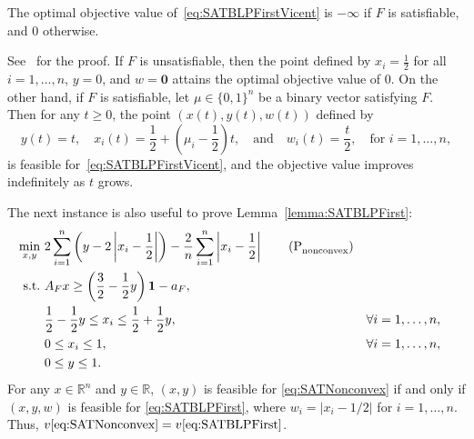 \documentclass[runningheads,orivec]{llncs}
\newcommand{\MacroColor}[1]{#1}
\newcommand{\ZeroVector}{\mathbf{0}}
\newcommand{\OneVector}{\mathbf{1}}
\newcommand{\NVariables}{\MacroColor{n}}
\newcommand{\OptValFunc}{\MacroColor{v}}
\newcommand{\SATBooleanFormula}{\MacroColor{F}}
\newcommand{\ReformFrac}{\MacroColor{w}}
\newcommand{\BinaryVector}{\MacroColor{\mu}}
\begin{document}
\begin{appendix}
\begin{lemma}
\label{lemma:VicentInstance}
\mbox{}
The optimal objective value of~\eqref{eq:SATBLPFirstVicent} is $-\infty$ if $F$ is satisfiable, and $0$ otherwise.
\end{lemma}
See~\cite{RodriguesEtAl2024} for the proof.
If $\SATBooleanFormula$ is unsatisfiable, then the point defined by $x_i = \frac{1}{2}$ for all $i = 1, \ldots, \NVariables$, $y = 0$, and $\ReformFrac = \ZeroVector$ attains the optimal objective value of 0.  
On the other hand, if $\SATBooleanFormula$ is satisfiable, let $\BinaryVector \in \{ 0, 1 \}^{\NVariables}$ be a binary vector satisfying $\SATBooleanFormula$.
Then for any $t \ge 0$, the point $(x(t), y(t), \ReformFrac(t))$ defined by
$$
y(t) = t, \quad x_i(t) = \frac{1}{2} + \left(\BinaryVector_i - \frac{1}{2}\right)t, \quad \text{and} \quad \ReformFrac_i(t) = \frac{t}{2}, \quad \text{for } i = 1, \ldots, \NVariables,
$$
is feasible for~\eqref{eq:SATBLPFirstVicent}, and the objective value improves indefinitely as $t$ grows.

The next instance is also useful to prove Lemma~\ref{lemma:SATBLPFirst}:
\begin{align}
\min_{x, y} \ & 2 \sum_{i = 1}^{n} \left(y - 2 \left|x_i - \frac{1}{2}\right| \right) - \frac{2}{n} \sum_{i = 1}^n \left|x_i - \frac{1}{2}\right|
\tag{P${}_{\text{nonconvex}}^{\text{}}$}
\label{eq:SATNonconvex}
\\
\text{s.t.} \ &
A_{\SATBooleanFormula} x \ge \left(\frac{3}{2} - \frac{1}{2} y\right) \OneVector - a_{\SATBooleanFormula}, \notag \\
&
\frac{1}{2} - \frac{1}{2} y \le x_i \le \frac{1}{2} + \frac{1}{2} y, 
&&
\forall i = 1, \ldots, n, \label{eq:SATNonconvexConstraintTwo} \\
& 
0 \le x_i \le 1, 
&&
\forall i = 1, \ldots, n,
\notag \\
& 
0 \le y \le 1.
\notag
\end{align}
For any $x \in \mathbb{R}^{\NVariables}$ and $y \in \mathbb{R}$, $(x, y)$ is feasible for \eqref{eq:SATNonconvex} if and only if $(x, y, \ReformFrac)$ is feasible for \eqref{eq:SATBLPFirst}, where $\ReformFrac_i = |x_i - 1/2|$ for $i = 1, \ldots, \NVariables$.
Thus, $\OptValFunc\eqref{eq:SATNonconvex} = \OptValFunc\eqref{eq:SATBLPFirst}$.


\end{appendix}
\end{document}
